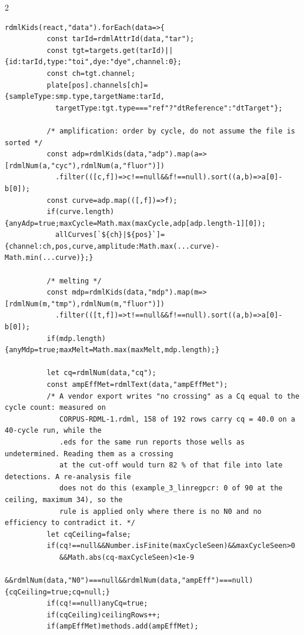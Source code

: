\begin{multicols}{2}
\begin{lstlisting}[style=jstiny]
        rdmlKids(react,"data").forEach(data=>{
          const tarId=rdmlAttrId(data,"tar");
          const tgt=targets.get(tarId)||{id:tarId,type:"toi",dye:"dye",channel:0};
          const ch=tgt.channel;
          plate[pos].channels[ch]={sampleType:smp.type,targetName:tarId,
            targetType:tgt.type==="ref"?"dtReference":"dtTarget"};

          /* amplification: order by cycle, do not assume the file is sorted */
          const adp=rdmlKids(data,"adp").map(a=>[rdmlNum(a,"cyc"),rdmlNum(a,"fluor")])
            .filter(([c,f])=>c!==null&&f!==null).sort((a,b)=>a[0]-b[0]);
          const curve=adp.map(([,f])=>f);
          if(curve.length){anyAdp=true;maxCycle=Math.max(maxCycle,adp[adp.length-1][0]);
            allCurves[`${ch}|${pos}`]={channel:ch,pos,curve,amplitude:Math.max(...curve)-Math.min(...curve)};}

          /* melting */
          const mdp=rdmlKids(data,"mdp").map(m=>[rdmlNum(m,"tmp"),rdmlNum(m,"fluor")])
            .filter(([t,f])=>t!==null&&f!==null).sort((a,b)=>a[0]-b[0]);
          if(mdp.length){anyMdp=true;maxMelt=Math.max(maxMelt,mdp.length);}

          let cq=rdmlNum(data,"cq");
          const ampEffMet=rdmlText(data,"ampEffMet");
          /* A vendor export writes "no crossing" as a Cq equal to the cycle count: measured on
             CORPUS-RDML-1.rdml, 158 of 192 rows carry cq = 40.0 on a 40-cycle run, while the
             .eds for the same run reports those wells as undetermined. Reading them as a crossing
             at the cut-off would turn 82 % of that file into late detections. A re-analysis file
             does not do this (example_3_linregpcr: 0 of 90 at the ceiling, maximum 34), so the
             rule is applied only where there is no N0 and no efficiency to contradict it. */
          let cqCeiling=false;
          if(cq!==null&&Number.isFinite(maxCycleSeen)&&maxCycleSeen>0
             &&Math.abs(cq-maxCycleSeen)<1e-9
             &&rdmlNum(data,"N0")===null&&rdmlNum(data,"ampEff")===null){cqCeiling=true;cq=null;}
          if(cq!==null)anyCq=true;
          if(cqCeiling)ceilingRows++;
          if(ampEffMet)methods.add(ampEffMet);


\end{lstlisting}
\end{multicols}
